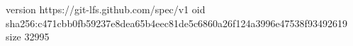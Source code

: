 version https://git-lfs.github.com/spec/v1
oid sha256:c471cbb0fb59237e8dea65b4eec81de5c6860a26f124a3996e47538f93492619
size 32995
